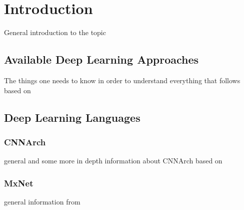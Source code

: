 \chapter{Introduction}

General introduction to the topic

\section{Available Deep Learning Approaches}

The things one needs to know in order to understand everything that follows based on \cite{chen2015deepdriving}

\section{Deep Learning Languages}

\subsection{CNNArch}

general and some more in depth information about CNNArch based on \cite{CNNArch}

\subsection{MxNet}

general information from \cite{chen2015mxnet}